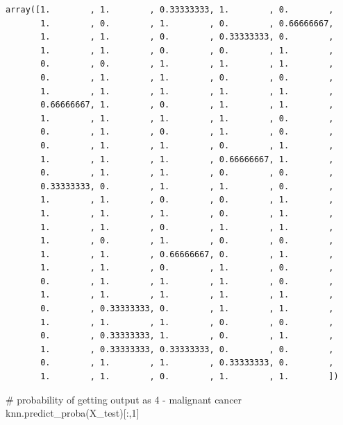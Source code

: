 \documentclass[
  letterpaper,
  DIV=11,
  numbers=noendperiod]{scrreprt}
\newenvironment{Shaded}{\begin{snugshade}}{\end{snugshade}}
\newcommand{\CommentTok}[1]{\textcolor[rgb]{0.37,0.37,0.37}{#1}}
\newcommand{\DecValTok}[1]{\textcolor[rgb]{0.68,0.00,0.00}{#1}}
\newcommand{\NormalTok}[1]{\textcolor[rgb]{0.00,0.23,0.31}{#1}}
\begin{document}
\begin{verbatim}
array([1.        , 1.        , 0.33333333, 1.        , 0.        ,
       1.        , 0.        , 1.        , 0.        , 0.66666667,
       1.        , 1.        , 0.        , 0.33333333, 0.        ,
       1.        , 1.        , 0.        , 0.        , 1.        ,
       0.        , 0.        , 1.        , 1.        , 1.        ,
       0.        , 1.        , 1.        , 0.        , 0.        ,
       1.        , 1.        , 1.        , 1.        , 1.        ,
       0.66666667, 1.        , 0.        , 1.        , 1.        ,
       1.        , 1.        , 1.        , 1.        , 0.        ,
       0.        , 1.        , 0.        , 1.        , 0.        ,
       0.        , 1.        , 1.        , 0.        , 1.        ,
       1.        , 1.        , 1.        , 0.66666667, 1.        ,
       0.        , 1.        , 1.        , 0.        , 0.        ,
       0.33333333, 0.        , 1.        , 1.        , 0.        ,
       1.        , 1.        , 0.        , 0.        , 1.        ,
       1.        , 1.        , 1.        , 0.        , 1.        ,
       1.        , 1.        , 0.        , 1.        , 1.        ,
       1.        , 0.        , 1.        , 0.        , 0.        ,
       1.        , 1.        , 0.66666667, 0.        , 1.        ,
       1.        , 1.        , 0.        , 1.        , 0.        ,
       0.        , 1.        , 1.        , 1.        , 0.        ,
       1.        , 1.        , 1.        , 1.        , 1.        ,
       0.        , 0.33333333, 0.        , 1.        , 1.        ,
       1.        , 1.        , 1.        , 0.        , 0.        ,
       0.        , 0.33333333, 1.        , 0.        , 1.        ,
       1.        , 0.33333333, 0.33333333, 0.        , 0.        ,
       0.        , 1.        , 1.        , 0.33333333, 0.        ,
       1.        , 1.        , 0.        , 1.        , 1.        ])
\end{verbatim}

\begin{Shaded}
\begin{Highlighting}[]
\CommentTok{\# probability of getting output as 4 {-} malignant cancer}
\NormalTok{knn.predict\_proba(X\_test)[:,}\DecValTok{1}\NormalTok{]}
\end{Highlighting}
\end{Shaded}
\end{document}
